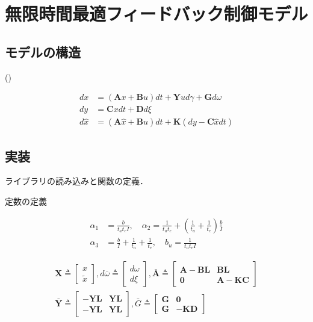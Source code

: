\section{無限時間最適フィードバック制御モデル}
\subsection{モデルの構造}
\textbf{} (\textbf{}) \cite{Qian2013-zy}


\begin{align}
d x&=(\mathbf{A} x+\mathbf{B} u) dt +\mathbf{Y} u d \gamma+\mathbf{G} d \omega \\
d y&=\mathbf{C} x dt+\mathbf{D} d \xi\\
d \hat{x}&=(\mathbf{A} \hat{x}+\mathbf{B} u) dt+\mathbf{K}(dy-\mathbf{C} \hat{x} dt)
\end{align}
\subsection{実装}
ライブラリの読み込みと関数の定義．

定数の定義


\begin{align}
\alpha_{1}&=\frac{b}{t_{a} t_{e} I},\quad \alpha_{2}=\frac{1}{t_{a} t_{e}}+\left(\frac{1}{t_{a}}+\frac{1}{t_{e}}\right) \frac{b}{I} \\
\alpha_{3}&=\frac{b}{I}+\frac{1}{t_{a}}+\frac{1}{t_{e}},\quad b_{u}=\frac{1}{t_{a} t_{e} I}
\end{align}


\begin{align}
\mathbf{X}\triangleq\begin{bmatrix}
x \\
\tilde{x}
\end{bmatrix}, d \bar{\omega} \triangleq\begin{bmatrix}
d \omega \\
d \xi
\end{bmatrix}, \bar{\mathbf{A}} \triangleq\begin{bmatrix}
\mathbf{A}-\mathbf{B} \mathbf{L} & \mathbf{B} \mathbf{L} \\
\mathbf{0} & \mathbf{A}-\mathbf{K} \mathbf{C}
\end{bmatrix}\\
\bar{\mathbf{Y}} \triangleq\begin{bmatrix}
-\mathbf{Y} \mathbf{L} & \mathbf{Y} \mathbf{L} \\
-\mathbf{Y} \mathbf{L} & \mathbf{Y} \mathbf{L}
\end{bmatrix}, \bar{G} \triangleq\begin{bmatrix}
\mathbf{G} & \mathbf{0} \\
\mathbf{G} & -\mathbf{K} \mathbf{D}
\end{bmatrix}
\end{align}



